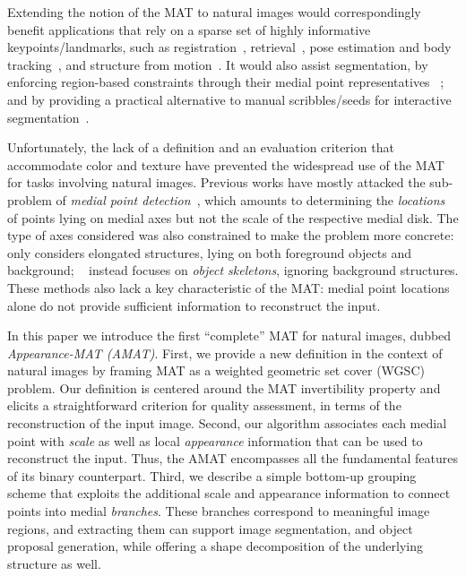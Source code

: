 \documentclass[10pt,twocolumn,letterpaper]{article}
\begin{document}
Extending the notion of the MAT to natural images would correspondingly benefit applications that rely on
a sparse set of highly informative keypoints/landmarks, such as registration~\cite{zhou2016estimating}, 
retrieval~\cite{sivic2003video}, pose estimation and body tracking~\cite{shotton2013efficient},
and structure from motion~\cite{agarwal2011building}.
It would also assist segmentation, by enforcing region-based constraints through their medial point representatives
~\cite{teo2015detection}; and by providing a practical alternative to manual 
scribbles/seeds for interactive segmentation~\cite{boykov2001interactive,price2010geodesic,isack2016hedgehog,lin2016scribblesup}.

Unfortunately, the lack of a definition and an evaluation criterion 
that accommodate color and texture have prevented the widespread use of the MAT for tasks involving natural images.
Previous works have mostly attacked the sub-problem of \emph{medial point detection}~\cite{tsogkas2012learning,shen2016object},
which amounts to determining the \emph{locations} of points lying on medial axes 
but not the scale of the respective medial disk.
The type of axes considered was also constrained to make the problem more concrete:
\cite{tsogkas2012learning} only considers elongated structures, lying on both foreground objects and background; 
~\cite{shen2016object} instead focuses on \emph{object skeletons}, ignoring background structures.
These methods also lack a key characteristic of the MAT: medial point locations alone do not provide sufficient
information to reconstruct the input.

In this paper we introduce the first ``complete'' MAT for natural images, dubbed \emph{Appearance-MAT (AMAT)}.
First, we provide a new definition in the context of natural images by framing MAT 
as a weighted geometric set cover (WGSC) problem.
Our definition is centered around the MAT invertibility property and elicits 
a straightforward criterion for quality assessment, in terms of the reconstruction of the input image.
Second, our algorithm associates each medial point with \emph{scale} as well as local \emph{appearance} information
that can be used to reconstruct the input.
Thus, the AMAT encompasses all the fundamental features of its  binary counterpart. 
Third, we describe a simple bottom-up grouping scheme that exploits the additional scale and appearance information to connect
points into medial \emph{branches}.
These branches correspond to meaningful image regions, and extracting them can support image segmentation,
and object proposal generation, while offering a shape decomposition of the underlying structure as well. 
\end{document}
